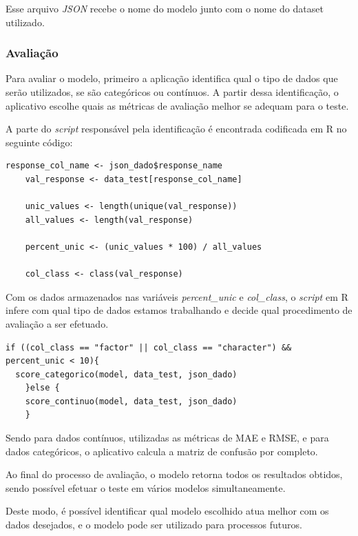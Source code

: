 \documentclass[
    12pt,               %
    openright,          %
    oneside,            %
    a4paper,            %
    english,            %
    brazil              %
    ]{abntex2}
\begin{document}
Esse arquivo \textit{JSON} recebe o nome do modelo junto com o nome do dataset utilizado.

\subsubsection{Avaliação}

Para avaliar o modelo, primeiro a aplicação identifica qual o tipo de dados que serão
utilizados, se são categóricos ou contínuos. A partir dessa identificação, o aplicativo
escolhe quais as métricas de avaliação melhor se adequam para o teste.

A parte do \textit{script} responsável pela identificação é encontrada codificada em R no seguinte
código:

\begin{lstlisting}[style=r_code]
    response_col_name <- json_dado$response_name
    val_response <- data_test[response_col_name]

    unic_values <- length(unique(val_response))
    all_values <- length(val_response)

    percent_unic <- (unic_values * 100) / all_values

    col_class <- class(val_response)
\end{lstlisting}

Com os dados armazenados nas variáveis \textit{percent\_unic} e \textit{col\_class}, o \textit{script} em
R infere com qual tipo de dados estamos trabalhando e decide qual procedimento de avaliação
a ser efetuado.

\begin{lstlisting}[style=r_code]
    if ((col_class == "factor" || col_class == "character") &&  percent_unic < 10){
  score_categorico(model, data_test, json_dado)
    }else {
    score_continuo(model, data_test, json_dado)
    }
\end{lstlisting}

Sendo para dados contínuos, utilizadas as métricas de MAE e RMSE, e para dados categóricos,
o aplicativo calcula a matriz de confusão por completo.

Ao final do processo de avaliação, o modelo retorna todos os resultados obtidos, sendo
possível efetuar o teste em vários modelos simultaneamente.

Deste modo, é possível identificar qual modelo escolhido atua melhor com os dados
desejados, e o modelo pode ser utilizado para processos futuros.

\end{document}
